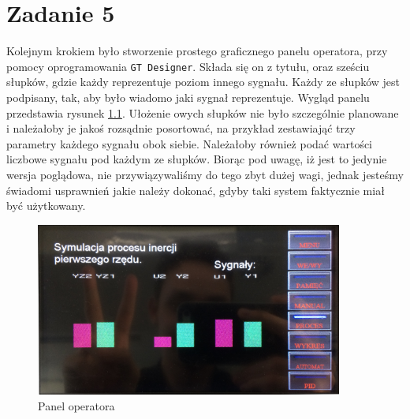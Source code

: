 \chapter{Zadanie 5}
Kolejnym krokiem było stworzenie prostego graficznego panelu operatora,
przy pomocy oprogramowania \texttt{GT Designer}. Składa się on z tytułu,
oraz sześciu słupków, gdzie każdy reprezentuje poziom innego sygnału.
Każdy ze słupków jest podpisany, tak, aby było wiadomo jaki sygnał reprezentuje.
Wygląd panelu przedstawia rysunek \ref{pic:panel}.
Ułożenie owych słupków nie było szczególnie planowane i należałoby je jakoś
rozsądnie posortować, na przykład zestawiająć trzy parametry każdego sygnału
obok siebie. Należałoby również podać wartości liczbowe sygnału pod każdym ze
słupków. Biorąc pod uwagę, iż jest to jedynie wersja poglądowa, nie przywiązywaliśmy
do tego zbyt dużej wagi, jednak jesteśmy świadomi usprawnień jakie należy
dokonać, gdyby taki system faktycznie miał być użytkowany.

\begin{figure}[tb]
  \centering
  \includegraphics[width=0.9\textwidth]{Pictures/proces.jpg}
  \caption{Panel operatora}
  \label{pic:panel}
\end{figure}
